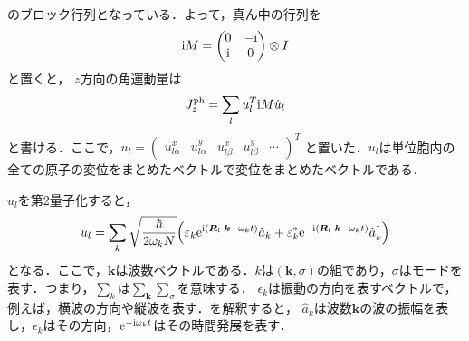 \documentclass{report}
\begin{document}
のブロック行列となっている．よって，真ん中の行列を
\begin{align}
  \mathrm{i} M =
  \begin{pmatrix}
    0 & -\mathrm{i}\\
    \mathrm{i} & 0
  \end{pmatrix}
  \otimes I
\end{align}
と置くと，
$z$方向の角運動量は
\begin{align}
  J_z^{\mathrm{ph}} = \sum_{l} u_l^T \mathrm{i} M \dot{u}_l \label{angular}
\end{align}
と書ける．ここで，$u_l = \begin{pmatrix}
  u_{l\alpha}^{x}&
  u_{l\alpha}^{y}&
  u_{l\beta}^{x}&
  u_{l\beta}^{y}&
  \cdots
\end{pmatrix}^T$
と置いた．$u_l$は単位胞内の全ての原子の変位をまとめたベクトルで変位をまとめたベクトルである．

$u_l$を第2量子化すると，
\begin{align}
  u_l = \sum_{k} \sqrt{\frac{\hbar}{2\omega_k N}}\qty(\varepsilon_k \mathrm{e}^{\mathrm{i}(\bm{R}_l\cdot\bm{k} - \omega_k t)}\hat{a}_k + \varepsilon_k^* \mathrm{e}^{-\mathrm{i}(\bm{R}_l\cdot\bm{k} - \omega_k t)}\hat{a}_k^\dagger) \label{phonon}
\end{align}
となる．ここで，$\bm{k}$は波数ベクトルである．$k$は$(\bm{k},\sigma)$の組であり，$\sigma$はモードを表す．つまり，$\sum_{k}$は$\sum_{\bm{k}}\sum_{\sigma}$を意味する．
$\epsilon_k$は振動の方向を表すベクトルで，例えば，横波の方向や縦波を表す．を解釈すると，
$\hat{a}_k$は波数$\bm{k}$の波の振幅を表し，$\epsilon_k$はその方向，$\mathrm{e}^{-\mathrm{i}\omega_k t}$はその時間発展を表す．
\end{document}

